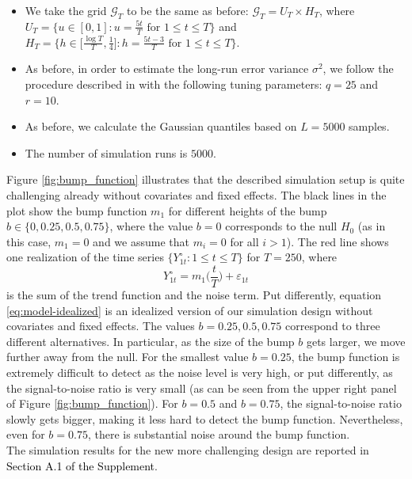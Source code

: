 \documentclass[a4paper,12pt]{article}
\newcommand{\reference}[1]{\textcolor{black}{#1}}
\begin{document}
\begin{enumerate}[label=\arabic*.,leftmargin=0.6cm]
\begin{enumerate}[label=(\roman*),leftmargin=0.75cm,topsep=0pt]
\begin{itemize}[leftmargin=0.45cm,itemsep=0pt,topsep=0pt]
\begin{figure}[t!]
\end{figure}

\item We take the grid $\mathcal{G}_T$ to be the same as before: $\mathcal{G}_T = U_T \times H_T$, where $U_T = \big\{ u \in [0,1]: u = \textstyle{\frac{5t}{T}} \text{ for } 1 \le t \le T \big\}$ and $H_T = \big\{ h \in \big[ \textstyle{\frac{\log T}{T}}, \textstyle{\frac{1}{4}} \big]:  h = \textstyle{\frac{5t - 3}{T}} \text{ for } 1 \le t \le T \big\}$.

\item As before, in order to estimate the long-run error variance $\sigma^2$, we follow the procedure described in \citet{KhismatullinaVogt2020} with the following tuning parameters: $q = 25$ and $r = 10$.

\item As before, we calculate the Gaussian quantiles based on $L = 5000$ samples. 

\item The number of simulation runs is $5000$. 

\end{itemize}

Figure \ref{fig:bump_function} illustrates that the described simulation setup is quite challenging already without covariates and fixed effects. The black lines in the plot show the bump function $m_1$ for different heights of the bump $b \in \{0, 0.25, 0.5, 0.75\}$, where the value $b=0$ corresponds to the null $H_0$ (as in this case, $m_1 = 0$ and we assume that $m_i = 0$ for all $i > 1$). The red line shows one realization of the time series $\{Y_{1t}^\circ:1 \le t \le T \}$ for $T=250$, where 
\begin{equation}\label{eq:model-idealized}
Y_{1t}^\circ = m_1\Big(\frac{t}{T}\Big) + \varepsilon_{1t} 
\end{equation}
is the sum of the trend function and the noise term. Put differently, equation \eqref{eq:model-idealized} is an idealized version of our simulation design without covariates and fixed effects. The values $b=0.25,0.5,0.75$ correspond to three different alternatives. In particular, as the size of the bump $b$ gets larger, we move further away from the null. For the smallest value $b=0.25$, the bump function is extremely difficult to detect as the noise level is very high, or put differently, as the signal-to-noise ratio is very small (as can be seen from the upper right panel of Figure \ref{fig:bump_function}). For $b=0.5$ and $b=0.75$, the signal-to-noise ratio slowly gets bigger, making it less hard to detect the bump function. Nevertheless, even for $b=0.75$, there is substantial noise around the bump function. \\ %
The simulation results for the new more challenging design are reported in \reference{Section A.1 of the Supplement}. 


\end{enumerate}
\end{enumerate}
\end{document}
